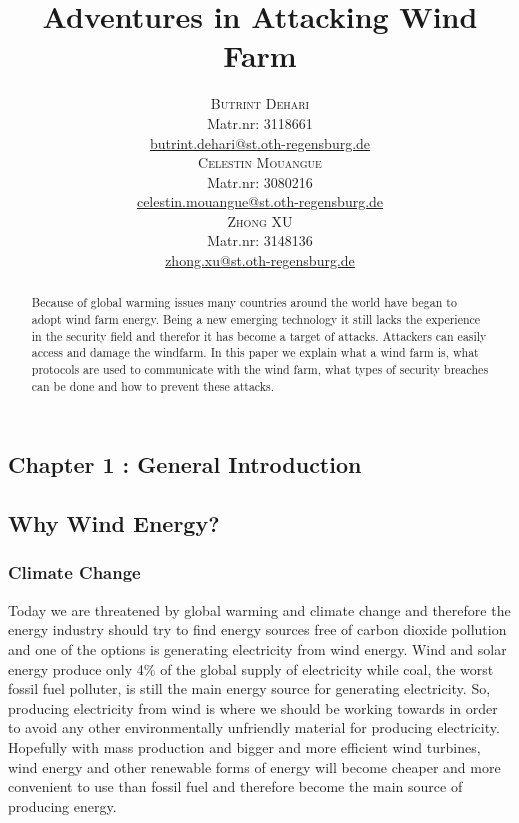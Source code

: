 \documentclass[twosided,a4,10pt]{article}
\title{\vspace{-5mm}%
	\fontsize{20pt}{10pt}\selectfont
	\textbf{Adventures in Attacking Wind Farm}
	}
\author{
	\large
       \begin{minipage}[t]{0.33\linewidth}
         \begin{center}
           	\textsc{Butrint Dehari}\\[2mm]
                 \normalsize	Matr.nr: 3118661\\
                 \normalsize
                 \href{mailto:autor1@stud.oth-regensburg.de}
                 {butrint.dehari@st.oth-regensburg.de}      
         \end{center}
       \end{minipage}        
       \begin{minipage}[t]{0.33\linewidth}
         \begin{center}
           	\textsc{Celestin Mouangue}\\[2mm]
                 \normalsize	Matr.nr: 3080216\\
                 \normalsize
                 \href{mailto:autor2@stud.oth-regensburg.de}
                 {celestin.mouangue@st.oth-regensburg.de}      
         \end{center}
       \end{minipage}
       \begin{minipage}[t]{0.33\linewidth}
         \begin{center}
           	\textsc{Zhong XU}\\[2mm]
                 \normalsize	Matr.nr: 3148136\\
                 \normalsize
                 \href{mailto:autor3@stud.oth-regensburg.de}
                 {zhong.xu@st.oth-regensburg.de}      
         \end{center}
       \end{minipage}
     }
\begin{document}
\maketitle
\thispagestyle{fancy}

\begin{abstract}
\noindent 
Because of global warming issues many countries around the world have began to adopt wind farm energy. Being a new emerging technology it still lacks the experience in the security field and therefor it has become a target of attacks. Attackers can easily access and damage the windfarm. In this paper we explain what a wind farm is, what protocols are used to communicate with the wind farm, what types of security breaches can be done and how to prevent these attacks.
\end{abstract}
\begin{multicols}{2}


\section{Chapter 1 : General Introduction}

 \subsection{Why Wind Energy?}
 \subsubsection{Climate Change}
 Today we are threatened by global warming and climate change and therefore the energy industry should try to find energy sources free of carbon dioxide pollution and one of the options is generating electricity from wind energy. Wind and solar energy produce only 4\% of the global supply of electricity while coal, the worst fossil fuel polluter, is still the main energy source for generating electricity. So, producing electricity from wind is where we should be working towards in order to avoid any other environmentally unfriendly material for producing electricity. Hopefully with mass production and bigger and more efficient wind turbines, wind energy and other renewable forms of energy will become cheaper and more convenient to use than fossil fuel and therefore become the main source of producing energy.

\end{multicols}
\end{document}
